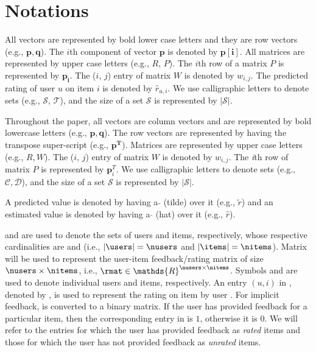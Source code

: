 \chapter{Notations}
\label{ch:notations}


All vectors are represented by bold lower case letters and they are row vectors (e.g., $\bm{p}, \bm{q}$). 
The $i$th component of vector $\bm{p}$ is denoted
by $\bm{p[i]}$. All matrices are represented by upper
case letters (e.g., $R$, $P$). The $i$th row of a matrix $P$  is represented by $\bm{p_i}$. The ($i$, $j$) entry of matrix $W$ is denoted by
$w_{i,j}$.
The predicted rating of user $u$ on item $i$ is denoted by $\hat{r}_{u,i}$.
We use calligraphic letters to denote sets (e.g., $\mathcal{S}$, $\mathcal{T}$), and the size of a set $\mathcal{S}$ is represented by
$|\mathcal{S}|$.







\iffalse

Throughout the paper, all vectors are column vectors and are represented by
bold lowercase letters (e.g., $\bm{p,q}$). The row vectors are represented by
having the transpose super-script (e.g., $\bm{p^T}$). Matrices are represented by upper
case letters (e.g., ${R,W}$). The ($i$, $j$) entry of matrix $W$ is denoted by
$w_{i,j}$. The \textit{i}th row of matrix $P$ is represented by $\bm{p}_i^T$. We use calligraphic letters to denote sets (e.g.,
$\mathcal{C,D}$), and the size of a set $\mathcal{S}$ is represented by
$|\mathcal{S}|$. 
 
 
A predicted value is denoted by having a
$\mathbf{\tilde{}}$ (tilde) over it (e.g., $\tilde {r}$) and an estimated value
is denoted by having a $\mathbf{\hat{}}$ (hat) over it (e.g., $\hat {r}$).

\users and \items are used to denote the sets of users and items, respectively,
whose respective cardinalities are \nusers and \nitems (i.e., $|\users| =
\nusers$ and $|\items| = \nitems$). Matrix \rmat will be used to represent the
user-item feedback/rating matrix of size $\nusers \times \nitems$, i.e., $\rmat
\in \mathds{R}^{\nusers \times \nitems}$. Symbols \usru and \itmi are used to denote
individual users and items, respectively. An entry $(u, i)$ in \rmat, denoted by
\rui, is used to represent the rating on item \itmi by user \usru.
%
For implicit feedback, \rmat is converted to a binary matrix. If the user has
provided feedback for a particular item, then the corresponding entry in \rmat
is $1$, otherwise it is $0$. We will refer to the entries for which the user
has provided feedback as \emph{rated} items and those for which the user has
not provided feedback as \emph{unrated} items.

